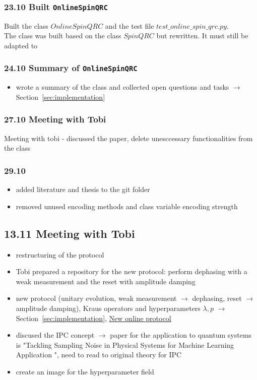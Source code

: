 \subsubsection*{23.10 \quad Built \texttt{OnlineSpinQRC}}
Built the class $OnlineSpinQRC$ and  the test file $test\_online\_spin\_qrc.py$. \\
The class was built based on the class $SpinQRC$ but rewritten. It must still be adapted to

\subsubsection*{24.10 \quad Summary of \texttt{OnlineSpinQRC}}
\begin{itemize}
    \item wrote a summary of the class and collected open questions and tasks $\to$ Section~\ref{sec:implementation}
\end{itemize}

\subsubsection*{27.10 \quad Meeting with Tobi}
Meeting with tobi - discussed the paper, delete unesccessary functionalities from the class

\subsubsection*{29.10}
\begin{itemize}
    \item added literature and thesis to the git folder
    \item removed unused encoding methods and class variable encoding strength
\end{itemize}


\subsection*{13.11 \quad Meeting with Tobi}
\begin{itemize}
    \item restructuring of the protocol
    \item Tobi prepared a repository for the new protocol: perform dephasing with a weak measurement and the reset with amplitude damping
    \item new protocol (unitary evolution, weak measurement $\to$ dephasing, reset $\to$ amplitude damping), Kraus operators and hyperparameters $\lambda, p$ $\to$ Section~\ref{sec:implementation}, \hyperref[sec:new-protocol]{New online protocol}
    \item discused the IPC concept $\to$ paper for the application to quantum systems is "Tackling Sampling Noise in Physical Systems for Machine Learning Application ", need to read to original theory for IPC
    \item create an image for the hyperparameter field
\end{itemize}

